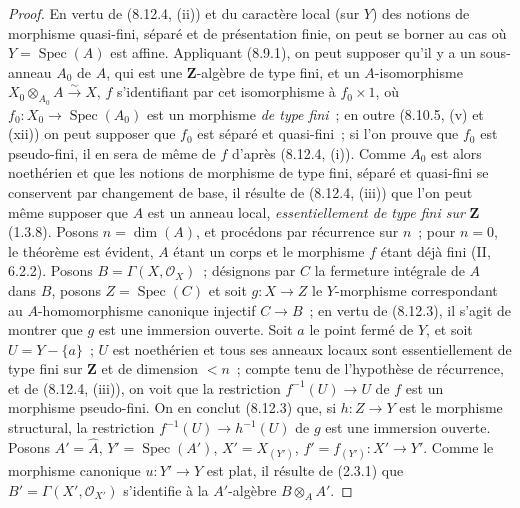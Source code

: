 \begin{proof}
En vertu de (8.12.4, (ii)) et du caractère local (sur $Y$) des notions de
morphisme quasi-fini, séparé et de présentation finie, on peut se borner au
cas où $Y=\operatorname{Spec}(A)$ est affine. Appliquant (8.9.1), on peut
supposer qu'il y a un sous-anneau $A_0$ de $A$, qui est une
$\mathbf Z$-algèbre de type fini, et un $A$-isomorphisme
$X_0\otimes_{A_0}A\xrightarrow{\sim}X$, $f$ s'identifiant par cet
isomorphisme à $f_0\times 1$, où
$f_0:X_0\to\operatorname{Spec}(A_0)$ est un morphisme \emph{de type fini}~;
en outre (8.10.5, (v) et (xii)) on peut supposer que $f_0$ est séparé et
quasi-fini~; si l'on prouve que $f_0$ est pseudo-fini, il en sera de même de
$f$ d'après (8.12.4, (i)). Comme $A_0$ est alors noethérien et que les
notions de morphisme de type fini, séparé et quasi-fini se conservent par
changement de base, il résulte de (8.12.4, (iii)) que l'on peut même supposer
que $A$ est un anneau local, \emph{essentiellement de type fini sur}
$\mathbf Z$ (1.3.8). Posons $n=\dim(A)$, et procédons par récurrence sur $n$~;
pour $n=0$, le théorème est évident, $A$ étant un corps et le morphisme $f$
étant déjà fini (II, 6.2.2). Posons $B=\Gamma(X,\mathcal O_X)$~; désignons
par $C$ la fermeture intégrale de $A$ dans $B$, posons
$Z=\operatorname{Spec}(C)$ et soit $g:X\to Z$ le $Y$-morphisme correspondant
au $A$-homomorphisme canonique injectif $C\to B$~; en vertu de (8.12.3), il
s'agit de montrer que $g$ est une immersion ouverte. Soit $a$ le point fermé
de $Y$, et soit $U=Y-\{a\}$~; $U$ est noethérien et tous ses anneaux locaux
sont essentiellement de type fini sur $\mathbf Z$ et de dimension $<n$~;
compte tenu de l'hypothèse de récurrence, et de (8.12.4, (iii)), on voit que
la restriction $f^{-1}(U)\to U$ de $f$ est un morphisme pseudo-fini. On en
conclut (8.12.3) que, si $h:Z\to Y$ est le morphisme structural, la
restriction $f^{-1}(U)\to h^{-1}(U)$ de $g$ est une immersion ouverte.
Posons $A'=\widehat A$, $Y'=\operatorname{Spec}(A')$,
$X'=X_{(Y')}$, $f'=f_{(Y')}:X'\to Y'$. Comme le morphisme canonique
$u:Y'\to Y$ est plat, il résulte de (2.3.1) que
$B'=\Gamma(X',\mathcal O_{X'})$ s'identifie à la $A'$-algèbre
$B\otimes_A A'$.


\end{proof}
